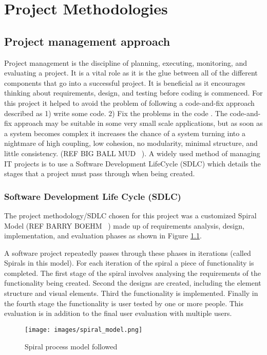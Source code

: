 
\chapter{Project Methodologies}\label{C:m}

\section{Project management approach}
Project management is the discipline of planning, executing, monitoring, and
evaluating a project. It is a vital role as it is the glue between all of the
different components that go into a successful project. It is beneficial as it
encourages thinking about requirements, design, and testing before coding is
commenced. For this project it helped to avoid the problem of following a
code-and-fix approach described  as 1) write some code. 2) Fix the problems in
the code \cite{boehm}. The code-and-fix approach may be suitable in some very
small scale applications, but as soon as a system becomes complex it increases
the chance of a system turning into a nightmare of high coupling, low cohesion,
no modularity, minimal structure, and little consistency. (REF BIG BALL MUD ~).
A widely used method of managing IT projects is to use a Software Development
LifeCycle (SDLC) which details the stages that a project must pass through  when
being created.

\subsection{Software Development Life Cycle (SDLC)}
The project methodology/SDLC chosen for
this project was a customized Spiral Model (REF BARRY BOEHM ~) made up of
requirements analysis, design, implementation, and evaluation phases as shown in
Figure \ref{fig:spiralModel}. 

A software project repeatedly passes through these phases in iterations (called
Spirals in this model). For each iteration of the spiral a piece of
functionality is completed. The first stage of the spiral involves analysing the
requirements of the functionality being created. Second the designs are created,
including the element structure and visual elements. Third the functionality is
implemented. Finally in the fourth stage the functionality is user tested by one
or more people. This evaluation is in addition to the final user evaluation with
multiple users. 

\begin{figure}[h!]
  \centering
      \texttt{[image: images/spiral\_model.png]}
  \caption{Spiral process model followed}
  \label{fig:spiralModel}
\end{figure}

